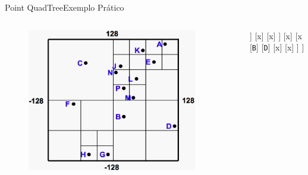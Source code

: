 \documentclass[red, tikz, aspectratio=169, xcolor=dvipsnames]{beamer}
\begin{document}
			\begin{frame}[fragile]{Point QuadTree}{Exemplo Prático}
				\centering
				\vspace{-40px}
				\begin{columns}
					\begin{column}{0.48\textwidth}
						\begin{figure}
							\centering
							\includegraphics[width=0.9\textwidth]{img/pr-quad.png}
						\end{figure}
					\end{column}
					\begin{column}{0.5\textwidth}
						\centering
						\fbox{
							\begin{forest}
								[\texttt{(x,y)}
								[NO]
								[NE]
								[SO]
								[SE]
								]
						\end{forest}}
						
						\begin{forest}
							[x
							[\texttt{C}
							]
							[x
								[x]
								[x
									[x]
									[\texttt{A}]
									[\texttt{E}]
									[x]
								]
								[x]
								[x]
							]
							[x]
							[x
							[\texttt{B}]
							[\texttt{D}]
							[x]
							[x]
							]
							]
						\end{forest}
						
					\end{column}
				\end{columns}
			\end{frame}
			
\end{document}
